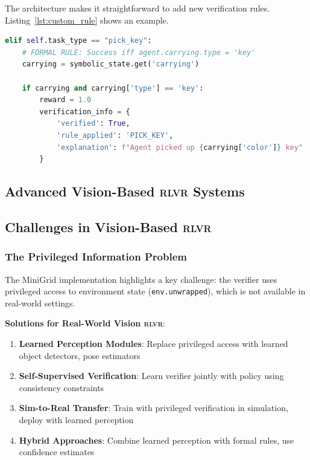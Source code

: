 \documentclass[11pt,a4paper]{article}
\newcommand{\rlvr}{\textsc{rlvr}}
\begin{document}
The architecture makes it straightforward to add new verification rules. Listing~\ref{lst:custom_rule} shows an example.

\begin{lstlisting}[caption={Custom verification rule for ``pick up key'' task}, label=lst:custom_rule, language=Python]
elif self.task_type == "pick_key":
    # FORMAL RULE: Success iff agent.carrying.type = 'key'
    carrying = symbolic_state.get('carrying')
    
    if carrying and carrying['type'] == 'key':
        reward = 1.0
        verification_info = {
            'verified': True,
            'rule_applied': 'PICK_KEY',
            'explanation': f"Agent picked up {carrying['color']} key"
        }
\end{lstlisting}

\subsection{Advanced Vision-Based \rlvr{} Systems}
\label{sec:advanced_vision}


\subsection{Challenges in Vision-Based \rlvr{}}
\label{sec:vision_challenges}

\subsubsection{The Privileged Information Problem}

The MiniGrid implementation highlights a key challenge: the verifier uses privileged access to environment state (\texttt{env.unwrapped}), which is not available in real-world settings.

\textbf{Solutions for Real-World Vision \rlvr{}}:

\begin{enumerate}[leftmargin=*]
    \item \textbf{Learned Perception Modules}: Replace privileged access with learned object detectors, pose estimators
    \item \textbf{Self-Supervised Verification}: Learn verifier jointly with policy using consistency constraints
    \item \textbf{Sim-to-Real Transfer}: Train with privileged verification in simulation, deploy with learned perception
    \item \textbf{Hybrid Approaches}: Combine learned perception with formal rules, use confidence estimates
\end{enumerate}
\end{document}
